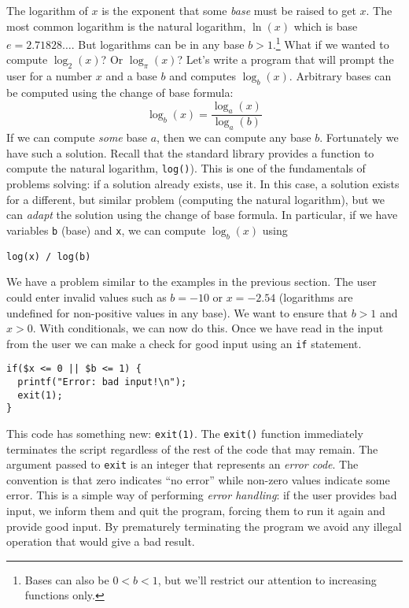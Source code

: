 The logarithm of $x$ is the exponent that some \emph{base} must 
be raised to get $x$.  The most common logarithm is the natural logarithm, 
$\ln{(x)}$ which is base $e = 2.71828\ldots$.  But logarithms can be in any base 
$b > 1$.\footnote{Bases can also be $0< b < 1$, but we'll restrict our attention to
increasing functions only.}  What if we wanted to compute $\log_2{(x)}$?  
Or $\log_{\pi}{(x)}$?  Let's write a program that will prompt the user for a
number $x$ and a base $b$ and computes $\log_b{(x)}$.
Arbitrary bases can be computed using the change of base formula: 
  $$\log_b(x) = \frac{\log_a{(x)}}{\log_a{(b)}}$$
If we can compute \emph{some} base $a$, then we can compute any base 
$b$.  Fortunately we have such a solution.  Recall that the standard library 
provides a function to compute the natural logarithm, \texttt{log()}).
This is one of the fundamentals of problems solving: if a solution already 
exists, use it.  In this case, a solution exists for a different, but similar problem
(computing the natural logarithm), but we can \emph{adapt} the solution 
using the change of base formula.  In particular, if we have variables 
\texttt{b} (base) and \texttt{x}, we can compute $\log_b{(x)}$ using

  \texttt{log(x) / log(b)}
  
We have a problem similar to the examples in the previous section.  
The user could enter invalid values such as $b = -10$ or $x = -2.54$ 
(logarithms are undefined for non-positive values in any base).  We want
to ensure that $b > 1$ and $x > 0$.  With conditionals, we can now do this.  
Once we have read in the input from the user we can make a check for
good input using an \texttt{if} statement.

\begin{verbatim}
if($x <= 0 || $b <= 1) {
  printf("Error: bad input!\n");
  exit(1);
}
\end{verbatim}

This code has something new: \texttt{exit(1)}.  The \texttt{exit()}
function immediately terminates the script regardless of the rest of the
code that may remain.  The argument passed to \texttt{exit} is an 
integer that represents an \emph{error code}.  The convention is that 
zero indicates ``no error'' while non-zero values indicate some error.  This
is a simple way of performing \emph{error handling}: if the user provides
bad input, we inform them and quit the program, forcing them to run it
again and provide good input.  By prematurely terminating the program
we avoid any illegal operation that would give a bad result.

